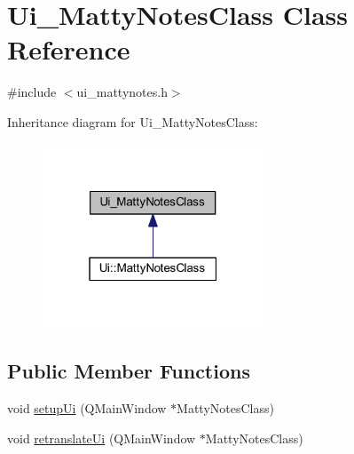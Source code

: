 \hypertarget{classUi__MattyNotesClass}{}\section{Ui\+\_\+\+Matty\+Notes\+Class Class Reference}
\label{classUi__MattyNotesClass}


{\ttfamily \#include $<$ui\+\_\+mattynotes.\+h$>$}



Inheritance diagram for Ui\+\_\+\+Matty\+Notes\+Class\+:
\nopagebreak
\begin{figure}[H]
\begin{center}
\leavevmode
\includegraphics[width=187pt]{classUi__MattyNotesClass__inherit__graph}
\end{center}
\end{figure}
\subsection*{Public Member Functions}
\begin{DoxyCompactItemize}
\item 
void \hyperlink{classUi__MattyNotesClass_a33a88ea08595a64d445a104fcdfb4e7c}{setup\+Ui} (Q\+Main\+Window $\ast$Matty\+Notes\+Class)
\item 
void \hyperlink{classUi__MattyNotesClass_a3a5915db60e9488bd96bf4ea0c844422}{retranslate\+Ui} (Q\+Main\+Window $\ast$Matty\+Notes\+Class)
\end{DoxyCompactItemize}
